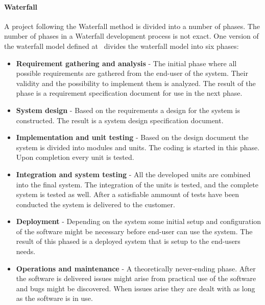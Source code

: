 \paragraph{Waterfall}
A project following the Waterfall method is divided into a number of phases.
The number of phases in a Waterfall development process is not exact.
One version of the waterfall model defined at~\citep{Parekh11} divides the waterfall model into six phases:

\begin{itemize}
	\item \textbf{Requirement gathering and analysis} - The initial phase where all possible requirements are gathered from the end-user of the system. Their validity and the possibility to implement them is analyzed. The result of the phase is a requirement specification document for use in the next phase.
	\item \textbf{System design} - Based on the requirements a design for the system is constructed. The result is a system design specification document.
	\item \textbf{Implementation and unit testing} - Based on the design document the system is divided into modules and units. The coding is started in this phase. Upon completion every unit is tested.
	\item \textbf{Integration and system testing} - All the developed units are combined into the final system. The integration of the units is tested, and the complete system is tested as well. After a satisfiable ammount of tests have been conducted the system is delivered to the customer.
	\item \textbf{Deployment} - Depending on the system some initial setup and configuration of the software might be necessary before end-user can use the system. The result of this phased is a deployed system that is setup to the end-users needs.
	\item \textbf{Operations and maintenance} - A theoretically never-ending phase. After the software is delivered issues might arise from practical use of the software and bugs might be discovered. When issues arise they are dealt with as long as the software is in use.
\end{itemize}

